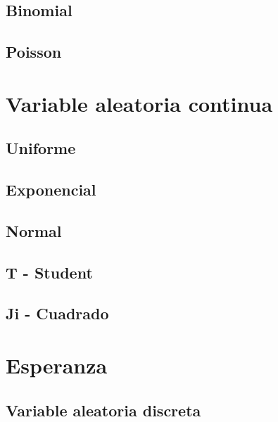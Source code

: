 \documentclass[
]{book}
\begin{document}
\hypertarget{binomial}{%
\subsection{Binomial}\label{binomial}}

\hypertarget{poisson}{%
\subsection{Poisson}\label{poisson}}

\hypertarget{variable-aleatoria-continua}{%
\section{Variable aleatoria continua}\label{variable-aleatoria-continua}}

\hypertarget{uniforme-1}{%
\subsection{Uniforme}\label{uniforme-1}}

\hypertarget{exponencial}{%
\subsection{Exponencial}\label{exponencial}}

\hypertarget{normal}{%
\subsection{Normal}\label{normal}}

\hypertarget{t---student}{%
\subsection{T - Student}\label{t---student}}

\hypertarget{ji---cuadrado}{%
\subsection{Ji - Cuadrado}\label{ji---cuadrado}}

\hypertarget{esperanza}{%
\section{Esperanza}\label{esperanza}}

\hypertarget{variable-aleatoria-discreta-1}{%
\subsection{Variable aleatoria discreta}\label{variable-aleatoria-discreta-1}}
\end{document}
